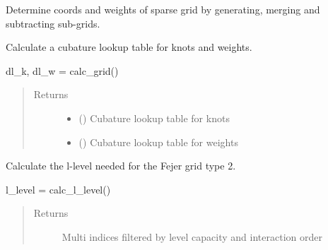 \documentclass[letterpaper,10pt,english,openany,oneside]{sphinxmanual}
\begin{document}
\begin{fulllineitems}
\begin{fulllineitems}
\label{\detokenize{pygpc:pygpc.Grid.SparseGrid.calc_coords_weights}}
Determine coords and weights of sparse grid by generating, merging and subtracting sub-grids.

\end{fulllineitems}


\begin{fulllineitems}
\label{\detokenize{pygpc:pygpc.Grid.SparseGrid.calc_grid}}
Calculate a cubature lookup table for knots and weights.

dl\_k, dl\_w = calc\_grid()
\begin{quote}\begin{description}
\item[{Returns}] \leavevmode
\begin{itemize}
\item {} 
 () \textendash{} Cubature lookup table for knots

\item {} 
 () \textendash{} Cubature lookup table for weights

\end{itemize}


\end{description}\end{quote}

\end{fulllineitems}


\begin{fulllineitems}
\label{\detokenize{pygpc:pygpc.Grid.SparseGrid.calc_l_level}}
Calculate the l-level needed for the Fejer grid type 2.

l\_level = calc\_l\_level()
\begin{quote}\begin{description}
\item[{Returns}] \leavevmode
{} \textendash{} Multi indices filtered by level capacity and interaction order


\end{description}
\end{quote}
\end{fulllineitems}
\end{fulllineitems}
\end{document}
